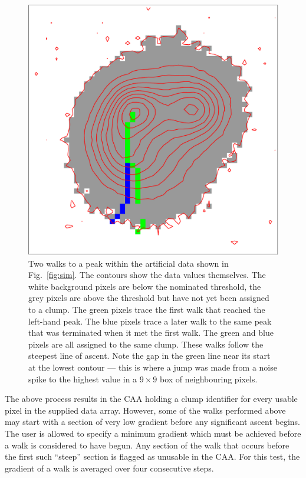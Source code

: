 \documentclass[final,authoryear,5p,times,twocolumn]{elsarticle}
\begin{document}
\begin{figure}
\includegraphics[width=\columnwidth]{walks}
\caption{Two walks to a peak within the artificial data shown in
Fig.~\ref{fig:sim}. The contours show the data values themselves. The white
background pixels are below the nominated threshold, the grey pixels are
above the threshold but have not yet been assigned to a clump. The green
pixels trace the first walk that reached the left-hand peak. The blue pixels
trace a later walk to the same peak that was terminated when it met the first
walk. The green and blue pixels are all assigned to the same clump. These
walks follow the steepest line of ascent. Note the gap in the green line
near its start at the lowest contour --- this is where a jump was made from
a noise spike to the highest value in a $9\times9$ box of neighbouring pixels.}

\label{fig:walks}
\end{figure}

The above process results in the CAA holding a clump identifier for every
usable pixel in the supplied data array. However, some of the walks
performed above may start with a section of very low gradient before any
significant ascent begins. The user is allowed to specify a minimum
gradient which must be achieved before a walk is considered to have
begun. Any section of the walk that occurs before the first such
``steep'' section is flagged as unusable in the CAA. For this test,
the gradient of a walk is averaged over four consecutive steps.
\end{document}
